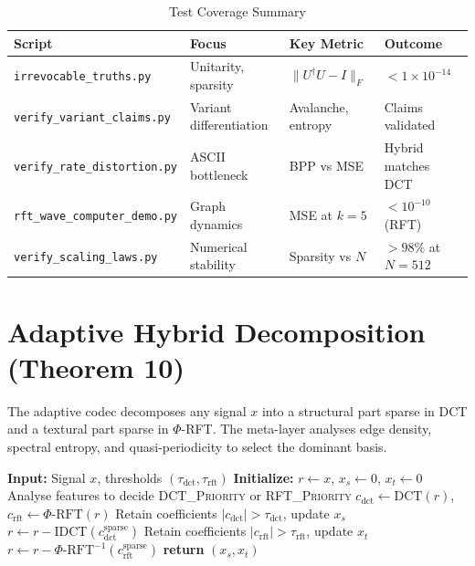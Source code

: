 \documentclass[11pt,a4paper]{article}
\begin{document}
\begin{table}[H]
\centering
\caption{Test Coverage Summary}
\label{tab:tests}
\begin{tabular}{@{}llll@{}}
\toprule
Script & Focus & Key Metric & Outcome \\ \midrule
\texttt{irrevocable\_truths.py} & Unitarity, sparsity & $\|U^\dagger U - I\|_F$ & $< 1\times 10^{-14}$ \\
\texttt{verify\_variant\_claims.py} & Variant differentiation & Avalanche, entropy & Claims validated \\
\texttt{verify\_rate\_distortion.py} & ASCII bottleneck & BPP vs MSE & Hybrid matches DCT \\
\texttt{rft\_wave\_computer\_demo.py} & Graph dynamics & MSE at $k=5$ & $<10^{-10}$ (RFT) \\
\texttt{verify\_scaling\_laws.py} & Numerical stability & Sparsity vs $N$ & $>98\%$ at $N=512$ \\ \bottomrule
\end{tabular}
\end{table}

\section{Adaptive Hybrid Decomposition (Theorem 10)}

The adaptive codec decomposes any signal $x$ into a structural part sparse in DCT and a textural part sparse in $\Phi$-RFT. The meta-layer analyses edge density, spectral entropy, and quasi-periodicity to select the dominant basis.

\begin{algorithm}
\caption{Adaptive Hybrid Compression}
\label{alg:hybrid}
\begin{algorithmic}[1]
\State \textbf{Input:} Signal $x$, thresholds $(\tau_{\text{dct}}, \tau_{\text{rft}})$
\State \textbf{Initialize:} $r \leftarrow x$, $x_s \leftarrow 0$, $x_t \leftarrow 0$
\State Analyse features to decide \textsc{DCT\_Priority} or \textsc{RFT\_Priority}
    \State $c_{\text{dct}} \leftarrow \text{DCT}(r)$, $c_{\text{rft}} \leftarrow \Phi\text{-RFT}(r)$
        \State Retain coefficients $|c_{\text{dct}}| > \tau_{\text{dct}}$, update $x_s$
        \State $r \leftarrow r - \text{IDCT}(c_{\text{dct}}^{\text{sparse}})$
    \Else
        \State Retain coefficients $|c_{\text{rft}}| > \tau_{\text{rft}}$, update $x_t$
        \State $r \leftarrow r - \Phi\text{-RFT}^{-1}(c_{\text{rft}}^{\text{sparse}})$
    \EndIf
\EndWhile
\State \textbf{return} $(x_s, x_t)$
\end{algorithmic}
\end{algorithm}
\end{document}
